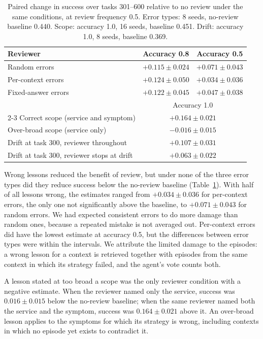 \documentclass{article}
\begin{document}
\begin{table}[t]
\centering
\caption{Paired change in success over tasks 301--600 relative to no review under the
same conditions, at review frequency 0.5. Error types: 8 seeds, no-review baseline
0.440. Scope: accuracy 1.0, 16 seeds, baseline 0.451. Drift: accuracy 1.0, 8 seeds,
baseline 0.369.}
\label{tab:reviewer}
\small
\begin{tabular}{lcc}
\toprule
Reviewer & Accuracy 0.8 & Accuracy 0.5 \\
\midrule
Random errors & $+0.115 \pm 0.024$ & $+0.071 \pm 0.043$ \\
Per-context errors & $+0.124 \pm 0.050$ & $+0.034 \pm 0.036$ \\
Fixed-answer errors & $+0.122 \pm 0.045$ & $+0.047 \pm 0.038$ \\
\midrule
& \multicolumn{2}{c}{Accuracy 1.0} \\
\cmidrule(lr){2-3}
Correct scope (service and symptom) & \multicolumn{2}{c}{$+0.164 \pm 0.021$} \\
Over-broad scope (service only) & \multicolumn{2}{c}{$-0.016 \pm 0.015$} \\
\addlinespace
Drift at task 300, reviewer throughout & \multicolumn{2}{c}{$+0.107 \pm 0.031$} \\
Drift at task 300, reviewer stops at drift & \multicolumn{2}{c}{$+0.063 \pm 0.022$} \\
\bottomrule
\end{tabular}
\end{table}

Wrong lessons reduced the benefit of review, but under none of the three error types
did they reduce success below the no-review baseline (Table~\ref{tab:reviewer}). With
half of all lessons wrong, the estimates ranged from $+0.034 \pm 0.036$ for per-context
errors, the only one not significantly above the baseline, to $+0.071 \pm 0.043$ for
random errors. We had expected consistent errors to do more damage than random ones,
because a repeated mistake is not averaged out. Per-context errors did have the lowest
estimate at accuracy 0.5, but the differences between error types were within the
intervals. We attribute the limited damage to the episodes: a wrong lesson for a context
is retrieved together with episodes from the same context in which its strategy failed,
and the agent's vote counts both.

A lesson stated at too broad a scope was the only reviewer condition with a negative
estimate. When the reviewer named only the service, success was $0.016 \pm 0.015$ below
the no-review baseline; when the same reviewer named both the service and the symptom,
success was $0.164 \pm 0.021$ above it. An over-broad lesson applies to the symptoms for
which its strategy is wrong, including contexts in which no episode yet exists to
contradict it.
\end{document}
